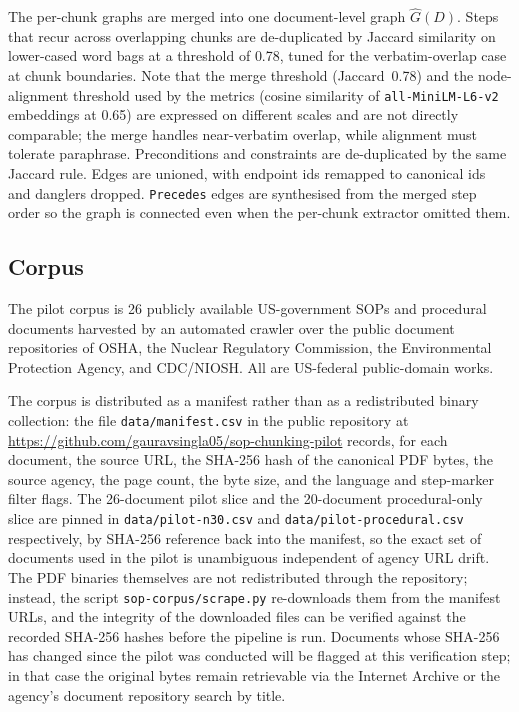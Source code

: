 \documentclass[make,article,submit,oneauthor,pdftex]{Definitions/mdpi}
\begin{document}
The per-chunk graphs are merged into one document-level graph
$\hat{G}(D)$. Steps that recur across overlapping chunks are
de-duplicated by Jaccard similarity on lower-cased word bags at a
threshold of 0.78, tuned for the verbatim-overlap case at chunk
boundaries. Note that the merge threshold (Jaccard~0.78) and the
node-alignment threshold used by the metrics (cosine similarity of
\texttt{all-MiniLM-L6-v2} embeddings at 0.65) are expressed on
different scales and are not directly comparable; the merge handles
near-verbatim overlap, while alignment must tolerate paraphrase.
Preconditions and constraints are de-duplicated by the same Jaccard
rule. Edges are unioned, with endpoint ids remapped to canonical ids
and danglers dropped. \texttt{Precedes} edges are synthesised from the
merged step order so the graph is connected even when the per-chunk
extractor omitted them.

\subsection{Corpus}

The pilot corpus is 26 publicly available US-government SOPs and
procedural documents harvested by an automated crawler over the public
document repositories of OSHA, the Nuclear Regulatory Commission, the
Environmental Protection Agency, and CDC/NIOSH. All are US-federal
public-domain works.

The corpus is distributed as a manifest rather than as a redistributed
binary collection: the file \texttt{data/manifest.csv} in the public
repository at
\url{https://github.com/gauravsingla05/sop-chunking-pilot} records, for
each document, the source URL, the SHA-256 hash of the canonical PDF
bytes, the source agency, the page count, the byte size, and the
language and step-marker filter flags. The 26-document pilot slice and
the 20-document procedural-only slice are pinned in
\texttt{data/pilot-n30.csv} and \texttt{data/pilot-procedural.csv}
respectively, by SHA-256 reference back into the manifest, so the
exact set of documents used in the pilot is unambiguous independent of
agency URL drift. The PDF binaries themselves are not redistributed
through the repository; instead, the script
\texttt{sop-corpus/scrape.py} re-downloads them from the manifest
URLs, and the integrity of the downloaded files can be verified
against the recorded SHA-256 hashes before the pipeline is run.
Documents whose SHA-256 has changed since the pilot was conducted will
be flagged at this verification step; in that case the original bytes
remain retrievable via the Internet Archive or the agency's document
repository search by title.
\end{document}
